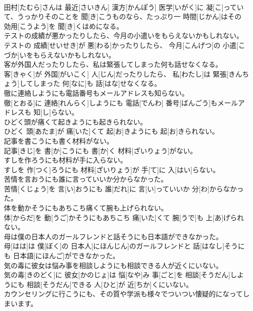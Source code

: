 \documentclass[8pt]{extreport}
\begin{document}
\begin{CJK}{UTF8}{min}
\\	田村[たむら]さんは 最近[さいきん] 漢方[かんぽう] 医学[いがく]に 凝[こ]っていて、うっかりそのことを 聞[き]こうものなら、たっぷり一 時間[じかん]はその 効用[こうよう]を 聞[き]くはめになる。
\\	テストの成績が悪かったりしたら、今月の小遣いをもらえないかもしれない。	
\\	テストの 成績[せいせき]が 悪[わる]かったりしたら、 今月[こんげつ]の 小遣[こづか]いをもらえないかもしれない。
\\	客が外国人だったりしたら、私は緊張してしまった何も話せなくなる。	
\\	客[きゃく]が 外国[がいこく] 人[じん]だったりしたら、 私[わたし]は 緊張[きんちょう]してしまった 何[なに]も 話[はな]せなくなる。
\\	徹に連絡しようにも電話番号もメールアドレスも知らない。	
\\	徹[とおる]に 連絡[れんらく]しようにも 電話[でんわ] 番号[ばんごう]もメールアドレスも 知[し]らない。
\\	ひどく頭が痛くて起きようにも起きられない。	
\\	ひどく 頭[あたま]が 痛[いた]くて 起[お]きようにも 起[お]きられない。
\\	記事を書こうにも書く材料がない。	
\\	記事[きじ]を 書[か]こうにも 書[か]く 材料[ざいりょう]がない。
\\	すしを作ろうにも材料が手に入らない。	
\\	すしを 作[つく]ろうにも 材料[ざいりょう]が 手[て]に 入[はい]らない。
\\	苦情を言おうにも誰に言っていいか分からなかった。	
\\	苦情[くじょう]を 言[い]おうにも 誰[だれ]に 言[い]っていいか 分[わ]からなかった。
\\	体を動かそうにもあちこち痛くて腕も上げられない。	
\\	体[からだ]を 動[うご]かそうにもあちこち 痛[いた]くて 腕[うで]も 上[あ]げられない。
\\	母は僕の日本人のガールフレンドと話そうにも日本語ができなかった。	
\\	母[はは]は 僕[ぼく]の 日本人[にほんじん]のガールフレンドと 話[はなし]そうにも 日本語[にほんご]ができなかった。
\\	気の毒に彼女は悩み事を相談しようにも相談できる人が近くにいない。	
\\	気の毒[きのどく]に 彼女[かのじょ]は 悩[なや]み 事[ごと]を 相談[そうだん]しようにも 相談[そうだん]できる 人[ひと]が 近[ちか]くにいない。
\\	カウンセリングに行こうにも、その質や学派も様々でついつい懐疑的になってしまいます。	

\end{CJK}
\end{document}
